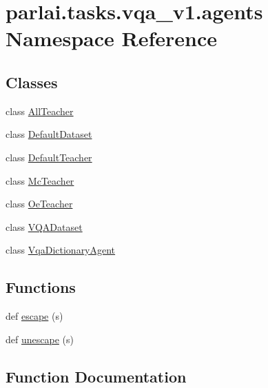 \hypertarget{namespaceparlai_1_1tasks_1_1vqa__v1_1_1agents}{}\section{parlai.\+tasks.\+vqa\+\_\+v1.\+agents Namespace Reference}
\label{namespaceparlai_1_1tasks_1_1vqa__v1_1_1agents}
\subsection*{Classes}
\begin{DoxyCompactItemize}
\item 
class \hyperlink{classparlai_1_1tasks_1_1vqa__v1_1_1agents_1_1AllTeacher}{All\+Teacher}
\item 
class \hyperlink{classparlai_1_1tasks_1_1vqa__v1_1_1agents_1_1DefaultDataset}{Default\+Dataset}
\item 
class \hyperlink{classparlai_1_1tasks_1_1vqa__v1_1_1agents_1_1DefaultTeacher}{Default\+Teacher}
\item 
class \hyperlink{classparlai_1_1tasks_1_1vqa__v1_1_1agents_1_1McTeacher}{Mc\+Teacher}
\item 
class \hyperlink{classparlai_1_1tasks_1_1vqa__v1_1_1agents_1_1OeTeacher}{Oe\+Teacher}
\item 
class \hyperlink{classparlai_1_1tasks_1_1vqa__v1_1_1agents_1_1VQADataset}{V\+Q\+A\+Dataset}
\item 
class \hyperlink{classparlai_1_1tasks_1_1vqa__v1_1_1agents_1_1VqaDictionaryAgent}{Vqa\+Dictionary\+Agent}
\end{DoxyCompactItemize}
\subsection*{Functions}
\begin{DoxyCompactItemize}
\item 
def \hyperlink{namespaceparlai_1_1tasks_1_1vqa__v1_1_1agents_a09703660c96aab40da3aa7f2386486cb}{escape} (s)
\item 
def \hyperlink{namespaceparlai_1_1tasks_1_1vqa__v1_1_1agents_ab44e9835e0cedea3719e3baebfe0e94b}{unescape} (s)
\end{DoxyCompactItemize}


\subsection{Function Documentation}
\mbox{\label{namespaceparlai_1_1tasks_1_1vqa__v1_1_1agents_a09703660c96aab40da3aa7f2386486cb}} 
